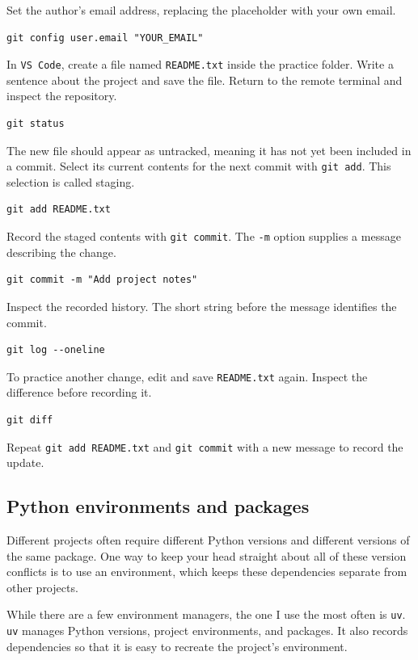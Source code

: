 \documentclass[12pt]{article}
\newcommand{\program}[1]{\begingroup\setlength{\fboxsep}{2pt}%
  \colorbox{ProgramBackground}{\texttt{#1}}\endgroup}
\newcommand{\inlinecode}[1]{\begingroup\setlength{\fboxsep}{2pt}%
  \colorbox{black!5}{\texttt{#1}}\endgroup}
\begin{document}
Set the author's email address, replacing the placeholder with your own email.
\begin{lstlisting}
git config user.email "YOUR_EMAIL"
\end{lstlisting}

In \program{VS Code}, create a file named \inlinecode{README.txt} inside the practice folder. Write a sentence about the project and save the file. Return to the remote terminal and inspect the repository.
\begin{lstlisting}
git status
\end{lstlisting}

The new file should appear as untracked, meaning it has not yet been included in a commit. Select its current contents for the next commit with \inlinecode{git add}. This selection is called staging.
\begin{lstlisting}
git add README.txt
\end{lstlisting}

Record the staged contents with \inlinecode{git commit}. The \inlinecode{-m} option supplies a message describing the change.
\begin{lstlisting}
git commit -m "Add project notes"
\end{lstlisting}

Inspect the recorded history. The short string before the message identifies the commit.
\begin{lstlisting}
git log --oneline
\end{lstlisting}

To practice another change, edit and save \inlinecode{README.txt} again. Inspect the difference before recording it.
\begin{lstlisting}
git diff
\end{lstlisting}

Repeat \inlinecode{git add README.txt} and \inlinecode{git commit} with a new message to record the update.


\clearpage
\subsection{Python environments and packages}

Different projects often require different Python versions and different versions of the same package. One way to keep your head straight about all of these version conflicts is to use an environment, which keeps these dependencies separate from other projects.

While there are a few environment managers, the one I use the most often is \program{uv}. \program{uv} manages Python versions, project environments, and packages. It also records dependencies so that it is easy to recreate the project's environment.
\end{document}
